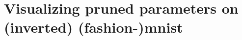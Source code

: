 \newpage
\section{Visualizing pruned parameters on (inverted) (fashion-)mnist}
\label{sec:fashion-mnist-invert}

\begin{figure}[h]
    \centering

\end{figure}
